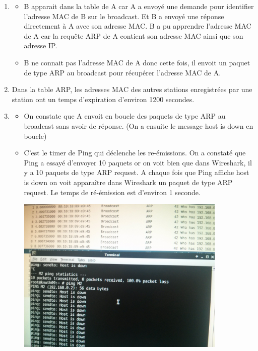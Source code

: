 \documentclass{article}
\begin{document}
\begin{enumerate}[label=\arabic*)]
	\item
	\begin{itemize}\renewcommand{\labelitemi}{$\bullet$}
		\item B apparait dans la table de A car A a envoyé une demande pour identifier l'adresse MAC de B sur le broadcast. Et B a envoyé une réponse directement à A avec son adresse MAC. B a pu apprendre l'adresse MAC de A car la requête ARP de A contient son adresse MAC ainsi que son adresse IP.

		\item B ne connait pas l'adresse MAC de A donc cette fois, il envoit un paquet de type ARP au broadcast pour récupérer l'adresse MAC de A.
	\end{itemize}

	\item Dans la table ARP, les adresses MAC des autres stations enregistrées par une station ont un temps d'expiration d'environ 1200 secondes.
	
	\item
	\begin{itemize}\renewcommand{\labelitemi}{$\bullet$}
		\item On constate que A envoit en boucle des paquets de type ARP au broadcast sans avoir de réponse. (On a ensuite le message host is down en boucle)
		\item C'est le timer de Ping qui déclenche les re-émissions. On a constaté que Ping a essayé d'envoyer 10 paquets or on voit bien que dans Wireshark, il y a 10 paquets de type ARP request. A chaque fois que Ping affiche host is down on voit apparaître dans Wireshark un paquet de type ARP request. Le temps de ré-émission est d'environ 1 seconde.

\includegraphics[width=10cm]{screen3.jpg}


\end{itemize}
\end{enumerate}
\end{document}
